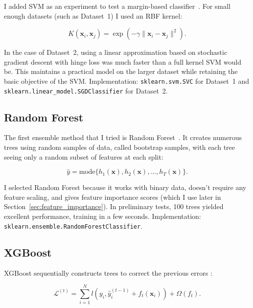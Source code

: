 I added SVM as an experiment to test a margin-based classifier~\citep{Cortes1995}. For small enough datasets (such as Dataset~1) I used an RBF kernel:

\begin{equation}
\label{eq:svm_kernel}
K(\mathbf{x}_i, \mathbf{x}_j) = \exp\left(-\gamma \|\mathbf{x}_i - \mathbf{x}_j\|^2\right).
\end{equation}

In the case of Dataset~2, using a linear approximation based on stochastic gradient descent with hinge loss was much faster than a full kernel SVM would be. This maintains a practical model on the larger dataset while retaining the basic objective of the SVM. Implementation: \texttt{sklearn.svm.SVC} for Dataset~1 and \texttt{sklearn.linear\_model.SGDClassifier} for Dataset~2.

\subsection{Random Forest}
\label{sec:random_forest}

The first ensemble method that I tried is Random Forest~\citep{Breiman2001}. It creates numerous trees using random samples of data, called bootstrap samples, with each tree seeing only a random subset of features at each split:

\begin{equation}
\label{eq:random_forest}
\hat{y} = \text{mode}\{h_1(\mathbf{x}), h_2(\mathbf{x}), \ldots, h_T(\mathbf{x})\}.
\end{equation}

I selected Random Forest because it works with binary data, doesn't require any feature scaling, and gives feature importance scores (which I use later in Section~\ref{sec:feature_importance}). In preliminary tests, 100 trees yielded excellent performance, training in a few seconds. Implementation: \texttt{sklearn.ensemble.RandomForestClassifier}.

\subsection{XGBoost}
\label{sec:xgboost}

XGBoost sequentially constructs trees to correct the previous errors \citep{Chen2016}:

\begin{equation}
\label{eq:xgboost}
\mathcal{L}^{(t)} = \sum_{i=1}^{N} l(y_i, \hat{y}_i^{(t-1)} + f_t(\mathbf{x}_i)) + \Omega(f_t).
\end{equation}


